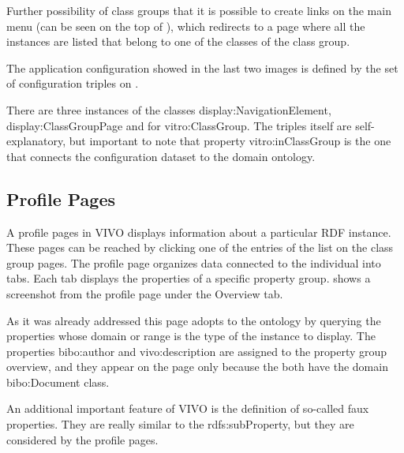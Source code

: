 
Further possibility of class groups that it is possible to create links on the main menu (can be seen on the top of ), which redirects to a page where all the instances are listed that belong to one of the classes of the class group.


The application configuration showed in the last two images is  defined by the set of configuration triples on .


There are three instances of the classes display:NavigationElement, display:ClassGroupPage and for vitro:ClassGroup. The triples itself are self-explanatory, but important to note that property vitro:inClassGroup is the one that connects the configuration dataset to the domain ontology.  

\subsection{Profile Pages}

A profile pages in VIVO displays information about a particular RDF instance. These pages can be reached by clicking one of the entries of the list on the class group pages. The profile page organizes data connected to the individual into tabs. Each tab displays the properties of a specific property group.  shows a screenshot from the profile page under the Overview tab.


As it was already addressed this page adopts to the ontology by querying the properties whose domain or range is the type of the instance to display.  The properties bibo:author and vivo:description are assigned to the property group overview, and they appear on the page only because the both have the domain bibo:Document class.


An additional important feature of VIVO is the definition of so-called faux properties. They are really similar to the rdfs:subProperty, but they are considered by the profile pages.

